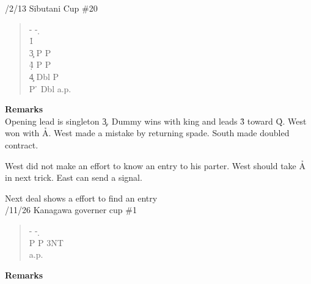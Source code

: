 /2/13 Sibutani Cup \#20
\begin{quote}
%
  {}%
  {}
  {}%
  {}%
\end{quote}
\begin{quote}
\begin{bidding}
- \> - \d   {}\h  \\
1\s {}\h {}\s  {}\c\\
3\s {}\c \> P \> P \\
4\d {}\h \> P \> P \\
4\s {}\c \> Dbl \> P \\
P \h \> Dbl \> a.p.
\end{bidding}
\end{quote}
{\bf Remarks}\\

Opening lead is singleton \c 3. Dummy wins with king and 
leads \h 3 toward \h Q. West won with \h A. West made a
mistake by returning spade. South made doubled contract.

West did not make an effort to know an entry to his parter.
West should take \h A in next trick. East can send a signal.



\vspace{0.5cm}



Next deal shows a effort to find an entry\\

/11/26 Kanagawa governer cup \#1
\begin{quote}
%
  {}%
  {}
  {}%
  {}%
\end{quote}
\begin{quote}
\begin{bidding}
- \> -  \d {}\c  \\
P \s \> P \> 3NT\\
a.p.
\end{bidding}
\end{quote}
{\bf Remarks}\\

